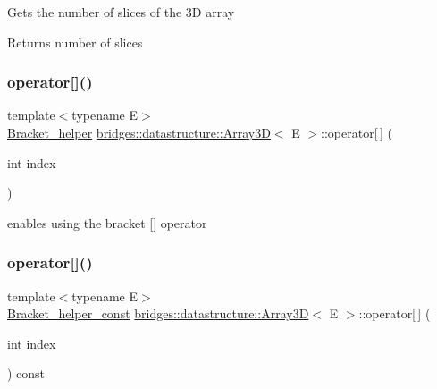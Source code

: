 Gets the number of slices of the 3D array \begin{DoxyReturn}{Returns}
number of slices 
\end{DoxyReturn}
\mbox{\label{classbridges_1_1datastructure_1_1_array3_d_a0b285b00e5d152d2968bee6b3aaf9349}} 
\subsubsection{\texorpdfstring{operator[]()}{operator[]()}\hspace{0.1cm}{\footnotesize\ttfamily [1/2]}}
{\footnotesize\ttfamily template$<$typename E$>$ \\
\mbox{\hyperlink{structbridges_1_1datastructure_1_1_array3_d_1_1_bracket__helper}{Bracket\+\_\+helper}} \mbox{\hyperlink{classbridges_1_1datastructure_1_1_array3_d}{bridges\+::datastructure\+::\+Array3D}}$<$ E $>$\+::operator\mbox{[}$\,$\mbox{]} (\begin{DoxyParamCaption}\item[{int}]{index }\end{DoxyParamCaption})\hspace{0.3cm}{\ttfamily [inline]}}



enables using the bracket \mbox{[}\mbox{]} operator 

\mbox{\label{classbridges_1_1datastructure_1_1_array3_d_acfc0446c919e7ca70cc31d0624b3bcd1}} 
\subsubsection{\texorpdfstring{operator[]()}{operator[]()}\hspace{0.1cm}{\footnotesize\ttfamily [2/2]}}
{\footnotesize\ttfamily template$<$typename E$>$ \\
\mbox{\hyperlink{structbridges_1_1datastructure_1_1_array3_d_1_1_bracket__helper__const}{Bracket\+\_\+helper\+\_\+const}} \mbox{\hyperlink{classbridges_1_1datastructure_1_1_array3_d}{bridges\+::datastructure\+::\+Array3D}}$<$ E $>$\+::operator\mbox{[}$\,$\mbox{]} (\begin{DoxyParamCaption}\item[{int}]{index }\end{DoxyParamCaption}) const\hspace{0.3cm}{\ttfamily [inline]}}



